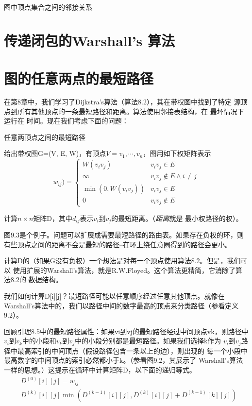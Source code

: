 图中顶点集合之间的邻接关系
\section{传递闭包的Warshall's 算法}
\section{图的任意两点的最短路径}\label{Sec:AllParisShortestPathsinGraphs}
在第8章中，我们学习了Dijkstra's算法（算法8.2），其在带权图中找到了特定
源顶点到所有其他顶点的一条最短路径和距离。算法使用邻接表结构，在
最坏情况下运行在 时间。现在我们考虑下面的问题：

\begin{problem}
任意两顶点之间的最短路径

给出带权图G=(V, E, W)，有顶点$V={v_1, \cdots, v_n}$，图用如下权矩阵表示
\begin{equation}
w_{ij})=\left\{\begin{array}{ll}
                   W(v_iv_j)           &v_iv_j \in E\\
                   \infty              &v_iv_j \not\in E \wedge  i\neq j\\
                   \min(0,W(v_iv_j))   &v_iv_j \in E \\
                   0                   &v_iv_j \not\in E
                 \end{array}
        \right.
\end{equation}

计算$n\times n$矩阵D，其中$d_{ij}$表示$v_i$到$v_j$的最短距离。（\emph{距离}就是
最小权路径的权）。
\end{problem}

图9.3是个例子。问题可以扩展成需要最短路径的路由表。如果存在负权的环，则
有些顶点之间的距离不会是最短的路径--在环上绕任意圈得到的路径会更小。

计算D的（如果G没有负权）一个想法是对每一个顶点使用算法8.2。但是，我们可以
使用扩展的Warshall's算法，就是R.W.Floyed。这个算法更精简，它消除了算法8.2的
数据结构。


我们如何计算D[i][j]？最短路径可能以任意顺序经过任意其他顶点。就像在
Warshall's算法中的，我们以路径中间的数字最高的顶点来分类路径（参看定义9.2）。

回顾引理8.5中的最短路径属性：如果vi到vj的最短路径经过中间顶点vk，则路径中
$v_i$到$v_k$中的小段和$v_k$到$v_j$中的小段分别都是最短路径。如果我们选择k作为
$v_i$到$v_j$路径中最高索引的中间顶点（假设路径包含一条以上的边），则出现的
每一个小段中最高数字的中间顶点的索引必然都小于k。（参看图9.2，其展示了
Warshall's算法一样的思想。）这提示在循环中计算矩阵D，以下面的递归等式。
\begin{equation}
\begin{aligned}
&D^{(0)}[i][j]=w_{ij} \\
&D^{(k)}[i][j]\min(D^{(k-1)}[i][j], D^{(k)}[i][j]+D^{(k-1)}[k][j])
\end{aligned}
\end{equation}

